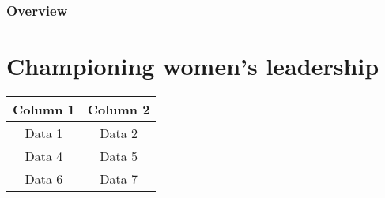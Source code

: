 \documentclass[12pt]{article}
\begin{document}
\subsubsection{Overview}

\section{Championing women's leadership}




\begin{center}
\begin{tabular}{||c|c||}
\hline
\hline
\rowcolor[HTML]{89A8B2} Column 1 & Column 2 \\
\hline
\hline
\rowcolor[HTML]{F8FAFC} Data 1 & Data 2 \\ %
\hline

\rowcolor[HTML]{D8EFD3} Data 4 & Data 5 \\
\hline

\rowcolor[HTML]{F8FAFC} Data 6 & Data 7 \\ %
\hline
\hline
\end{tabular}
\end{center}
\bigskip %

\subsubsection{}
\end{document}
